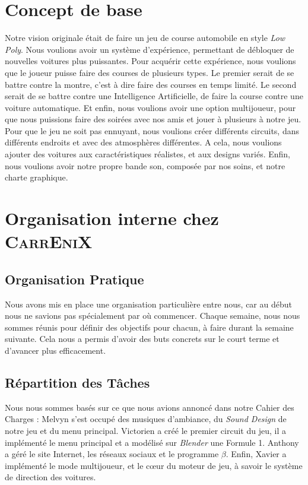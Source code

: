 \documentclass[a4paper,12pt]{article}
\newcommand{\AI}{Intelligence Artificielle}
\newcommand{\CEX}{\textsc{CarrEniX}}
\begin{document}
    \section{Concept de base}
        Notre vision originale était de faire un jeu de course automobile en style \textit{Low Poly}.
        Nous voulions avoir un système d'expérience, permettant de débloquer de nouvelles voitures plus puissantes.
        Pour acquérir cette expérience, nous voulions que le joueur puisse faire des courses de plusieurs types.
        Le premier serait de se battre contre la montre, c'est à dire faire des courses en temps limité.
        Le second serait de se battre contre une \AI, de faire la course contre une voiture automatique.
        Et enfin, nous voulions avoir une option multijoueur, pour que nous puissions faire des soirées avec nos amis
        et jouer à plusieurs à notre jeu. Pour que le jeu ne soit pas ennuyant, nous voulions créer différents
        circuits, dans différents endroits et avec des atmosphères différentes. A cela, nous voulions ajouter
        des voitures aux caractéristiques réalistes, et aux designs variés. Enfin, nous voulions avoir notre propre
        bande son, composée par nos soins, et notre charte graphique.
    
    
    \section{Organisation interne chez \CEX}
    \subsection{Organisation Pratique}
        Nous avons mis en place une organisation particulière entre nous,
        car au début nous ne savions pas spécialement par où commencer.
        Chaque semaine, nous nous sommes réunis pour définir des 
        objectifs pour chacun, à faire durant la semaine suivante. Cela nous 
        a permis d’avoir des buts concrets sur le court terme et d'avancer plus 
        efficacement.

    \subsection{Répartition des Tâches}
        Nous nous sommes basés sur ce que nous avions annoncé dans notre Cahier des Charges :
        Melvyn s'est occupé des musiques d'ambiance, du \textit{Sound Design} de 
        notre jeu et du menu principal. Victorien a créé le premier circuit du jeu,
        il a implémenté le menu principal et a modélisé sur \textsl{Blender} une Formule 1.
        Anthony a géré le site Internet, les réseaux sociaux et le programme \(\beta\).
        Enfin, Xavier a implémenté le mode multijoueur, et le cœur du moteur de jeu,
        à savoir le système de direction des voitures.
\end{document}
